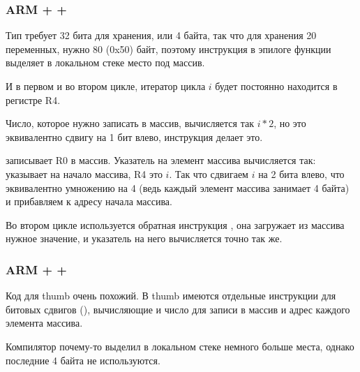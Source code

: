 ﻿\subsubsection{ARM + \NonOptimizingKeil + \ARMMode}



Тип \Tint требует 32 бита для хранения, или 4 байта, так что для хранения 20 переменных, нужно 80 (0x50) байт,
поэтому инструкция  в эпилоге функции выделяет в локальном стеке место под массив.

И в первом и во втором цикле, итератор цикла $i$ будет постоянно находится в регистре R4.

Число, которое нужно записать в массив, вычисляется так $i*2$, но это эквивалентно сдвигу на 1 бит влево, 
инструкция  делает это.

 записывает R0 в массив. Указатель на элемент массива вычисляется так: \SP указывает
на начало массива, R4 это $i$. Так что сдвигаем $i$ на 2 бита влево, что эквивалентно умножению на 4 (ведь каждый
элемент массива занимает 4 байта) и прибавляем к адресу начала массива.

Во втором цикле используется обратная инструкция , она загружает из массива нужное
значение, и указатель на него вычисляется точно так же.

\subsubsection{ARM + \OptimizingKeil + \ThumbMode}



Код для thumb очень похожий. В thumb имеются отдельные инструкции для битовых сдвигов (), вычисляющие и
число для записи в массив и адрес каждого элемента массива.

Компилятор почему-то выделил в локальном стеке немного больше места, однако последние 4 байта не используются.

